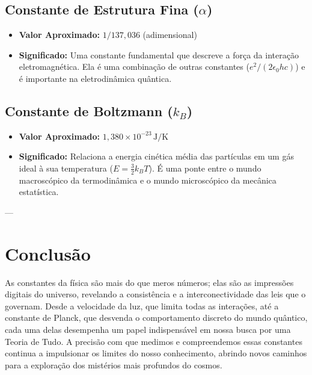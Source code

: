 \documentclass{article}
\begin{document}
\subsection{Constante de Estrutura Fina ($\alpha$)}
\begin{itemize}
    \item \textbf{Valor Aproximado:} $1/137,036$ (adimensional)
    \item \textbf{Significado:} Uma constante fundamental que descreve a força da interação eletromagnética. Ela é uma combinação de outras constantes ($e^2 / (2 \epsilon_0 hc)$) e é importante na eletrodinâmica quântica.
\end{itemize}

\subsection{Constante de Boltzmann ($k_B$)}
\begin{itemize}
    \item \textbf{Valor Aproximado:} $1,380 \times 10^{-23} \, \text{J/K}$
    \item \textbf{Significado:} Relaciona a energia cinética média das partículas em um gás ideal à sua temperatura ($E = \frac{3}{2} k_B T$). É uma ponte entre o mundo macroscópico da termodinâmica e o mundo microscópico da mecânica estatística.
\end{itemize}

---

\section{Conclusão}
As constantes da física são mais do que meros números; elas são as impressões digitais do universo, revelando a consistência e a interconectividade das leis que o governam. Desde a velocidade da luz, que limita todas as interações, até a constante de Planck, que desvenda o comportamento discreto do mundo quântico, cada uma delas desempenha um papel indispensável em nossa busca por uma Teoria de Tudo. A precisão com que medimos e compreendemos essas constantes continua a impulsionar os limites do nosso conhecimento, abrindo novos caminhos para a exploração dos mistérios mais profundos do cosmos.
\end{document}
